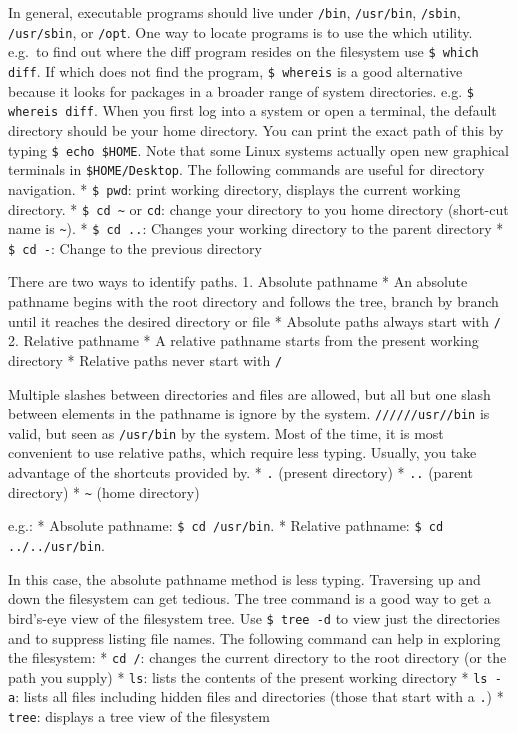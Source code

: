 In general, executable programs should live under \texttt{/bin},
\texttt{/usr/bin}, \texttt{/sbin}, \texttt{/usr/sbin}, or \texttt{/opt}.
One way to locate programs is to use the which utility. e.g.~to find out
where the diff program resides on the filesystem use
\texttt{\$ which diff}. If which does not find the program,
\texttt{\$ whereis} is a good alternative because it looks for packages
in a broader range of system directories. e.g. \texttt{\$ whereis diff}.
When you first log into a system or open a terminal, the default
directory should be your home directory. You can print the exact path of
this by typing \texttt{\$ echo \$HOME}. Note that some Linux systems
actually open new graphical terminals in \texttt{\$HOME/Desktop}. The
following commands are useful for directory navigation. *
\texttt{\$ pwd}: print working directory, displays the current working
directory. * \texttt{\$ cd \textasciitilde{}} or \texttt{cd}: change
your directory to you home directory (short-cut name is
\texttt{\textasciitilde{}}). * \texttt{\$ cd ..}: Changes your working
directory to the parent directory * \texttt{\$ cd -}: Change to the
previous directory

There are two ways to identify paths. 1. Absolute pathname * An absolute
pathname begins with the root directory and follows the tree, branch by
branch until it reaches the desired directory or file * Absolute paths
always start with \texttt{/} 2. Relative pathname * A relative pathname
starts from the present working directory * Relative paths never start
with \texttt{/}

Multiple slashes between directories and files are allowed, but all but
one slash between elements in the pathname is ignore by the system.
\texttt{//////usr//bin} is valid, but seen as \texttt{/usr/bin} by the
system. Most of the time, it is most convenient to use relative paths,
which require less typing. Usually, you take advantage of the shortcuts
provided by. * \texttt{.} (present directory) * \texttt{..} (parent
directory) * \texttt{\textasciitilde{}} (home directory)

e.g.: * Absolute pathname: \texttt{\$ cd /usr/bin}. * Relative pathname:
\texttt{\$ cd ../../usr/bin}.

In this case, the absolute pathname method is less typing. Traversing up
and down the filesystem can get tedious. The tree command is a good way
to get a bird's-eye view of the filesystem tree. Use \texttt{\$ tree -d}
to view just the directories and to suppress listing file names. The
following command can help in exploring the filesystem: * \texttt{cd /}:
changes the current directory to the root directory (or the path you
supply) * \texttt{ls}: lists the contents of the present working
directory * \texttt{ls -a}: lists all files including hidden files and
directories (those that start with a \texttt{.}) * \texttt{tree}:
displays a tree view of the filesystem

